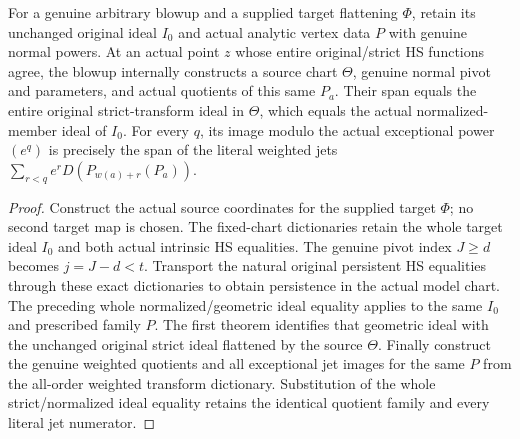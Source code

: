 \begin{theorem}
\label{hir:actual-persistent-fixed-family-strict-jets}
\leanok
For a genuine arbitrary blowup and a supplied target flattening $\Phi$, retain its unchanged original ideal $I_0$ and actual analytic vertex data $P$ with genuine normal powers.
At an actual point $z$ whose entire original/strict HS functions agree, the blowup internally constructs a source chart $\Theta$, genuine normal pivot and parameters, and actual quotients of this same $P_a$.
Their span equals the entire original strict-transform ideal in $\Theta$, which equals the actual normalized-member ideal of $I_0$.
For every $q$, its image modulo the actual exceptional power $(e^q)$ is precisely the span of the literal weighted jets $\sum_{r<q}e^rD(P_{w(a)+r}(P_a))$.
\end{theorem}
\begin{proof}
Construct the actual source coordinates for the supplied target $\Phi$; no second target map is chosen.
The fixed-chart dictionaries retain the whole target ideal $I_0$ and both actual intrinsic HS equalities.
The genuine pivot index $J\ge d$ becomes $j=J-d<t$.
Transport the natural original persistent HS equalities through these exact dictionaries to obtain persistence in the actual model chart.
The preceding whole normalized/geometric ideal equality applies to the same $I_0$ and prescribed family $P$.
The first theorem identifies that geometric ideal with the unchanged original strict ideal flattened by the source $\Theta$.
Finally construct the genuine weighted quotients and all exceptional jet images for the same $P$ from the all-order weighted transform dictionary. Substitution of the whole strict/normalized ideal equality retains the identical quotient family and every literal jet numerator.
\end{proof}

